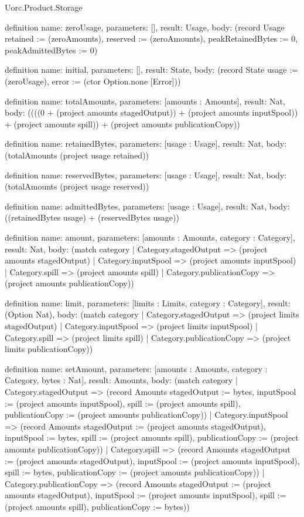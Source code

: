 \begin{lexlean}{Uorc.Product.Storage}
\begin{semanticmodule}
definition{
  name: zeroUsage,
  parameters: [],
  result: Usage,
  body: (record Usage {retained := (zeroAmounts), reserved := (zeroAmounts), peakRetainedBytes := 0, peakAdmittedBytes := 0})
}

definition{
  name: initial,
  parameters: [],
  result: State,
  body: (record State {usage := (zeroUsage), error := (ctor Option.none [Error])})
}

definition{
  name: totalAmounts,
  parameters: [amounts : Amounts],
  result: Nat,
  body: ((((0 + (project amounts stagedOutput)) + (project amounts inputSpool)) + (project amounts spill)) + (project amounts publicationCopy))
}

definition{
  name: retainedBytes,
  parameters: [usage : Usage],
  result: Nat,
  body: (totalAmounts (project usage retained))
}

definition{
  name: reservedBytes,
  parameters: [usage : Usage],
  result: Nat,
  body: (totalAmounts (project usage reserved))
}

definition{
  name: admittedBytes,
  parameters: [usage : Usage],
  result: Nat,
  body: ((retainedBytes usage) + (reservedBytes usage))
}

definition{
  name: amount,
  parameters: [amounts : Amounts, category : Category],
  result: Nat,
  body: (match category
    | Category.stagedOutput => (project amounts stagedOutput)
    | Category.inputSpool => (project amounts inputSpool)
    | Category.spill => (project amounts spill)
    | Category.publicationCopy => (project amounts publicationCopy))
}

definition{
  name: limit,
  parameters: [limits : Limits, category : Category],
  result: (Option Nat),
  body: (match category
    | Category.stagedOutput => (project limits stagedOutput)
    | Category.inputSpool => (project limits inputSpool)
    | Category.spill => (project limits spill)
    | Category.publicationCopy => (project limits publicationCopy))
}

definition{
  name: setAmount,
  parameters: [amounts : Amounts, category : Category, bytes : Nat],
  result: Amounts,
  body: (match category
    | Category.stagedOutput => (record Amounts {stagedOutput := bytes, inputSpool := (project amounts inputSpool), spill := (project amounts spill), publicationCopy := (project amounts publicationCopy)})
    | Category.inputSpool => (record Amounts {stagedOutput := (project amounts stagedOutput), inputSpool := bytes, spill := (project amounts spill), publicationCopy := (project amounts publicationCopy)})
    | Category.spill => (record Amounts {stagedOutput := (project amounts stagedOutput), inputSpool := (project amounts inputSpool), spill := bytes, publicationCopy := (project amounts publicationCopy)})
    | Category.publicationCopy => (record Amounts {stagedOutput := (project amounts stagedOutput), inputSpool := (project amounts inputSpool), spill := (project amounts spill), publicationCopy := bytes}))
}


\end{semanticmodule}
\end{lexlean}
